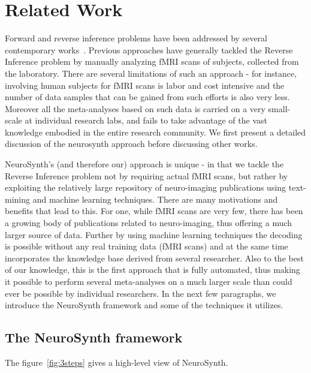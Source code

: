 \documentclass{article} %
\begin{document}
\section{Related Work}
Forward and reverse inference problems have been addressed by several contemporary works~\cite{schwartz2013mapping, PMSKBY12, sanmi2013multi, yarkoni2011large}. Previous approaches have generally tackled the Reverse Inference problem by manually analyzing fMRI scans of subjects, collected from the laboratory. There are several limitations of such an approach - for instance, involving human subjects for fMRI scans is labor and cost intensive and the number of data samples that can be gained from such efforts is also very less. Moreover all the meta-analyses based on such data is carried on a very small-scale at individual research labs, and fails to take advantage of the vast knowledge embodied in the entire research community. We first present a detailed discussion of the neurosynth approach before discussing other works.%

NeuroSynth's (and therefore our) approach is unique - in that we tackle the Reverse Inference problem not by requiring actual fMRI scans, but rather by exploiting the relatively large repository of neuro-imaging publications using text-mining and machine learning techniques.  There are many motivations and benefits that lead to this. For one, while fMRI scans are very few, there has been a growing body of publications related to neuro-imaging, thus offering a much larger source of data. Further by using machine learning techniques the decoding is possible without any real training data (fMRI scans) and at the same time incorporates the knowledge base derived from several researcher. Also to the best of our knowledge, this is the first approach that is fully automated, thus making it possible to perform several meta-analyses on a much larger scale than could ever be possible by individual researchers.  In the next few paragraphs, we introduce the NeuroSynth framework and some of the techniques it utilizes.

\subsection{The NeuroSynth framework}
\label{sec:neurosynth_framework}
The figure~\ref{fig:3steps} gives a high-level view of  NeuroSynth. 
\end{document}
